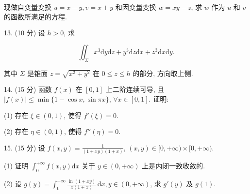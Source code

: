 \documentclass{examcollection}
\renewcommand{\displayformula}[1]{\[#1\]}
\begin{document}
{\begin{minipage}{\textwidth}
现做自变量变换 $u = x - y, v = x + y$ 和因变量变换 $w = xy - z$, 求 $w$ 作为 $u$ 和 $v$ 的函数所满足的方程.\par
13. (10 分) 设 $h > 0$, 求\par
\displayformula{\iint_ {\Sigma} x ^ {3} \mathrm{d} y \mathrm{d} z + y ^ {3} \mathrm{d} z \mathrm{d} x + z ^ {3} \mathrm{d} x \mathrm{d} y.}\par
其中 $\Sigma$ 是锥面 $z = \sqrt{x^2 + y^2}$ 在 $0 \leq z \leq h$ 的部分, 方向取上侧.\par
14. (15 分) 函数 $f(x)$ 在 $[0,1]$ 上二阶连续可导, 且 $|f(x)| \leq \min \{1 - \cos x, \sin \pi x\}$, $\forall x \in [0,1]$. 证明:\par
(1) 存在 $\xi \in (0,1)$, 使得 $f'(\xi) = 0$.\par
(2) 存在 $\eta \in (0,1)$, 使得 $f''(\eta) = 0$.\par
15. (15 分) 设 $f(x, y) = \frac{1}{(1 + xy)(1 + x)}$, $(x, y) \in [0, +\infty) \times [0, +\infty)$.\par
(1) 证明 $\int_0^{+\infty} f(x, y) \mathrm{d}x$ 关于 $y \in (0, +\infty)$ 上是内闭一致收敛的.\par
(2) 设 $g(y) = \int_{0}^{+\infty} \frac{\ln(1 + xy)}{x(1 + x)} \, \mathrm{d}x, y \in (0, +\infty)$, 求 $g'(y)$ 及 $g(1)$.\par
\end{minipage}}
\ifdim\dimexpr\ht\proofbox+\dp\proofbox\relax>\textheight
\noindent\resizebox{!}{\textheight}{\usebox{\proofbox}}\else\noindent\usebox{\proofbox}\fi\clearpage
\end{document}

